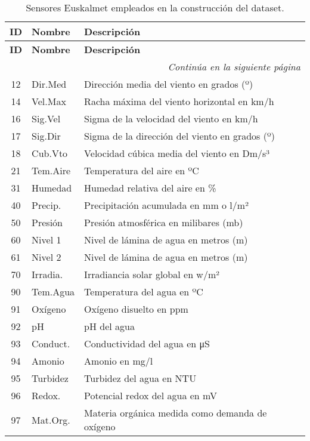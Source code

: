 \begin{longtable}{|c|l|p{8.5cm}|}
	\caption{Sensores Euskalmet empleados en la construcción del dataset.}
	\label{tab:sensores_euskalmet} \\
	\toprule
	\textbf{ID} & \textbf{Nombre} & \textbf{Descripción} \\
	\midrule
	\endfirsthead
	
	\toprule
	\textbf{ID} & \textbf{Nombre} & \textbf{Descripción} \\
	\midrule
	\endhead
	
	\midrule
	\multicolumn{3}{r}{\textit{Continúa en la siguiente página}} \\
	\midrule
	\endfoot
	
	\bottomrule
	\endlastfoot
	
	12 & Dir.Med & Dirección media del viento en grados (º) \\
	14 & Vel.Max & Racha máxima del viento horizontal en km/h \\
	16 & Sig.Vel & Sigma de la velocidad del viento en km/h \\
	17 & Sig.Dir & Sigma de la dirección del viento en grados (º) \\
	18 & Cub.Vto & Velocidad cúbica media del viento en Dm/s³ \\
	21 & Tem.Aire & Temperatura del aire en ºC \\
	31 & Humedad & Humedad relativa del aire en \% \\
	40 & Precip. & Precipitación acumulada en mm o l/m² \\
	50 & Presión & Presión atmosférica en milibares (mb) \\
	60 & Nivel 1 & Nivel de lámina de agua en metros (m) \\
	61 & Nivel 2 & Nivel de lámina de agua en metros (m) \\
	70 & Irradia. & Irradiancia solar global en w/m² \\
	90 & Tem.Agua & Temperatura del agua en ºC \\
	91 & Oxígeno & Oxígeno disuelto en ppm \\
	92 & pH & pH del agua \\
	93 & Conduct. & Conductividad del agua en μS \\
	94 & Amonio & Amonio en mg/l \\
	95 & Turbidez & Turbidez del agua en NTU \\
	96 & Redox. & Potencial redox del agua en mV \\
	97 & Mat.Org. & Materia orgánica medida como demanda de oxígeno \\

\end{longtable}
